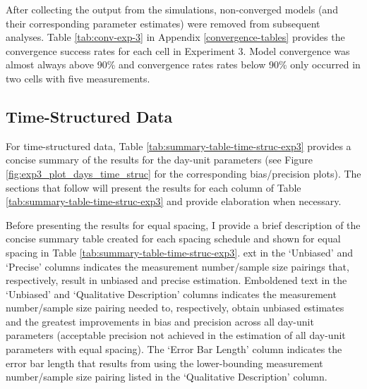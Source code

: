 \documentclass[
12pt, %
twoside,
english]{guelphthesis}
\begin{document}
After collecting the output from the simulations, non-converged models
(and their corresponding parameter estimates) were removed from
subsequent analyses. Table \ref{tab:conv-exp-3} in Appendix \ref{convergence-tables} provides the convergence
success rates for each cell in Experiment 3. Model convergence was almost always above 90\% and convergence rates
rates below 90\% only occurred in two cells with five measurements.

\hypertarget{concise-example-exp3}{%
\subsection{Time-Structured Data}\label{concise-example-exp3}}

For time-structured data, Table \ref{tab:summary-table-time-struc-exp3} provides a concise summary of the results for the day-unit parameters (see Figure \ref{fig:exp3_plot_days_time_struc} for the corresponding bias/precision plots). The sections that follow will present the results for each column of Table \ref{tab:summary-table-time-struc-exp3} and provide elaboration when necessary.

Before presenting the results for equal spacing, I provide a brief description of the concise summary table created for each spacing schedule and shown for equal spacing in Table \ref{tab:summary-table-time-struc-exp3}. ext in the `Unbiased' and `Precise' columns indicates the measurement number/sample size pairings that, respectively, result in unbiased and precise estimation. Emboldened text in the `Unbiased' and `Qualitative Description' columns indicates the measurement number/sample size pairing needed to, respectively, obtain unbiased estimates and the greatest improvements in bias and precision across all day-unit parameters (acceptable precision not achieved in the estimation of all day-unit parameters with equal spacing). The `Error Bar Length' column indicates the error bar length that results from using the lower-bounding measurement number/sample size pairing listed in the `Qualitative Description' column.
\end{document}
